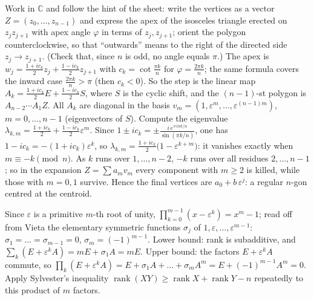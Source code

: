 \documentclass[11pt,a4paper]{article}
\begin{document}
 Work in $\mathbb C$ and follow the hint of the sheet: write the vertices as a vector $Z=(z_0,\dots,z_{n-1})$ and express the apex of the isosceles triangle erected on $z_jz_{j+1}$ with apex angle $\varphi$ in terms of $z_j,z_{j+1}$; orient the polygon counterclockwise, so that ``outwards'' means to the right of the directed side $z_j\to z_{j+1}$. (Check that, since $n$ is odd, no angle equals $\pi$.)
 The apex is $w_j=\frac{1+ic_k}2z_j+\frac{1-ic_k}2z_{j+1}$ with $c_k=\cot\frac{\pi k}n$ for $\varphi=\frac{2\pi k}{n}$; the same formula covers the inward case $\frac{2\pi k}n>\pi$ (then $c_k<0$). So the step is the linear map $A_k=\frac{1+ic_k}2E+\frac{1-ic_k}2S$, where $S$ is the cyclic shift, and the $(n-1)$-st polygon is $A_{n-2}\cdots A_1Z$.
 All $A_k$ are diagonal in the basis $v_m=(1,\varepsilon^m,\dots,\varepsilon^{(n-1)m})$, $m=0,\dots,n-1$ (eigenvectors of $S$). Compute the eigenvalue $\lambda_{k,m}=\frac{1+ic_k}2+\frac{1-ic_k}2\varepsilon^m$. Since $1\pm ic_k=\pm\frac{i\,e^{\mp i\pi k/n}}{\sin(\pi k/n)}$, one has $1-ic_k=-(1+ic_k)\varepsilon^k$, so $\lambda_{k,m}=\frac{1+ic_k}2\bigl(1-\varepsilon^{k+m}\bigr)$: it vanishes exactly when $m\equiv-k\pmod n$.
 As $k$ runs over $1,\dots,n-2$, $-k$ runs over all residues $2,\dots,n-1$; so in the expansion $Z=\sum a_mv_m$ every component with $m\ge2$ is killed, while those with $m=0,1$ survive. Hence the final vertices are $a_0+b\,\varepsilon^j$: a regular $n$-gon centred at the centroid.

 Since $\varepsilon$ is a primitive $m$-th root of unity, $\prod_{k=0}^{m-1}(x-\varepsilon^k)=x^m-1$; read off from Vieta the elementary symmetric functions $\sigma_j$ of $1,\varepsilon,\dots,\varepsilon^{m-1}$: $\sigma_1=\dots=\sigma_{m-1}=0$, $\sigma_m=(-1)^{m-1}$.
 Lower bound: rank is subadditive, and $\sum_{k}(E+\varepsilon^kA)=mE+\sigma_1A=mE$.
 Upper bound: the factors $E+\varepsilon^kA$ commute, so $\prod_k(E+\varepsilon^kA)=E+\sigma_1A+\dots+\sigma_mA^m=E+(-1)^{m-1}A^m=0$. Apply Sylvester's inequality $\operatorname{rank}(XY)\ge\operatorname{rank}X+\operatorname{rank}Y-n$ repeatedly to this product of $m$ factors.
\end{document}
